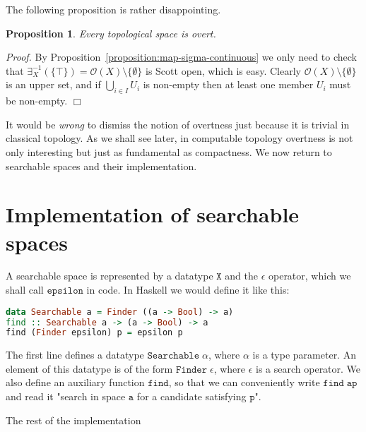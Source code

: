 \documentclass[a4paper,10pt]{article}
\newtheorem{proposition}[theorem]{Proposition}
\newenvironment{proof}{\par\noindent\textit{Proof.}}{\hfill$\Box$\par\medskip}
\newcommand{\set}[1]{\{#1\}}
\newcommand{\tpl}[1]{\mathcal{O}(#1)}
\newcommand{\R}[1]{\mathtt{#1}}
\begin{document}
The following proposition is rather disappointing.

\begin{proposition}
  Every topological space is overt.
\end{proposition}

\begin{proof}
  By Proposition~\ref{proposition:map-sigma-continuous} we only need
  to check that $\exists_X^{-1}(\set{\top}) = \tpl{X} \setminus
  \set{\emptyset}$ is Scott open, which is easy. Clearly $\tpl{X} \setminus
  \set{\emptyset}$ is an upper set, and if $\bigcup_{i \in I} U_i$ is
  non-empty then at least one member $U_i$ must be non-empty.
\end{proof}

It would be \emph{wrong} to dismiss the notion of overtness just because it is trivial in classical topology. As we shall see later, in computable topology overtness is not only interesting but just as fundamental as compactness. We now return to searchable spaces and their implementation.

\section{Implementation of searchable spaces}
\label{sec:implementation-searchable}

A searchable space is represented by a datatype $\mathtt{X}$ and the
$\epsilon$ operator, which we shall call $\R{epsilon}$ in code. In
Haskell we would define it like this:
%
\begin{lstlisting}[language=Haskell]
data Searchable a = Finder ((a -> Bool) -> a)
find :: Searchable a -> (a -> Bool) -> a
find (Finder epsilon) p = epsilon p
\end{lstlisting}
%
The first line defines a datatype $\mathtt{Searchable}\;\alpha$, where $\alpha$ is a type parameter. An element of this datatype is of the form $\mathtt{Finder}\;\epsilon$, where $\epsilon$ is a search operator. We also define an auxiliary function $\mathtt{find}$, so that we can conveniently write $\R{find}\;\R{a}\R{p}$ and read it "search in space $\R{a}$ for a candidate satisfying $\R{p}$".

The rest of the implementation 
\end{document}
